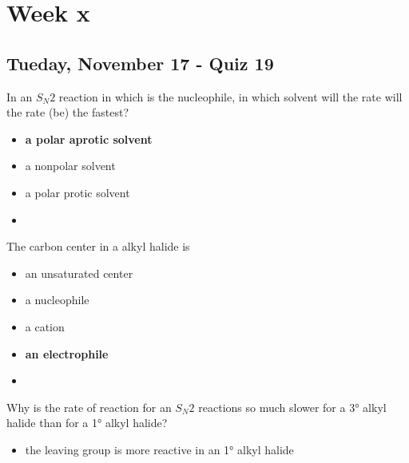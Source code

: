 \documentclass[12pt,a4paper]{article}
\begin{document}
\tableofcontents
\cleardoublepage
\fancyhead{}
\clearpage
\section*{Week x}
{}

\subsection{Tueday, November 17 - Quiz 19}
\begin{enumerate}
    {\color{G-Moon}\item In an \(S_N2\) reaction in which  is the nucleophile, in which solvent will the rate will the rate (be) the fastest?
    \begin{itemize}
        \item {\color{o-Sun}\textbf{a polar aprotic solvent}}
        \item a nonpolar solvent
        \item a polar protic solvent
    \end{itemize}
    }
    \begin{itemize}
        \item 
    \end{itemize}
    {\color{G-Moon}\item The carbon center in a alkyl halide is
    \begin{itemize}
        \item an unsaturated center
        \item a nucleophile
        \item a cation
        \item {\color{o-Sun}\textbf{an electrophile}}
    \end{itemize}
    }
    \begin{itemize}
        \item 
    \end{itemize}
    {\color{G-Moon}\item Why is the rate of reaction for an \(S_N2\) reactions so much slower for a \ang{3} alkyl halide than for a \ang{1} alkyl halide?
    \begin{itemize}
        \item the leaving group is more reactive in an \ang{1} alkyl halide

\end{itemize}}
\end{enumerate}
\end{document}
